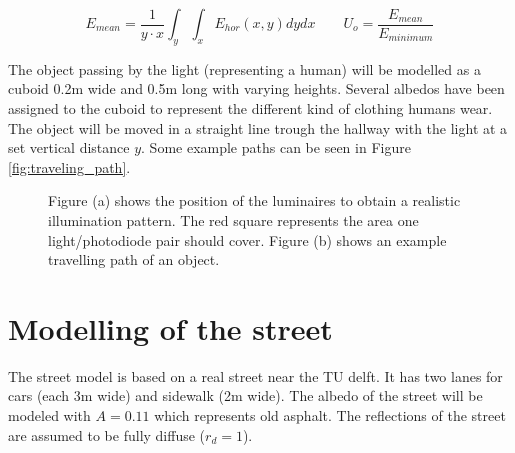 \begin{equation}
\label{Emean_and_Uo}
	E_{mean} = \frac{1}{y \cdot x}\int_y \int_x E_{hor}(x,y) dy dx
\qquad
	U_o = \frac{E_{mean}}{E_{minimum}}
\end{equation}

The object passing by the light (representing a human) will be modelled as a cuboid 0.2m wide and 0.5m long with varying heights. Several albedos have been assigned to the cuboid to represent the different kind of clothing humans wear. The object will be moved in a straight line trough the hallway with the light at a set vertical distance $y$. Some example paths can be seen in Figure \ref{fig:traveling_path}.

\begin{figure}
	\centering     %
	\caption{Figure (a) shows the position of the luminaires to obtain a realistic illumination pattern. The red square represents the area one light/photodiode pair should cover. Figure (b) shows an example travelling path of an object.}
\end{figure}

\section{Modelling of the street}
The street model is based on a real street near the TU delft. It has two lanes for cars (each 3m wide) and sidewalk (2m wide). The albedo of the street will be modeled with $A = 0.11$ which represents old asphalt\cite{Albedo}. The reflections of the street are assumed to be fully diffuse ($r_d = 1$).

